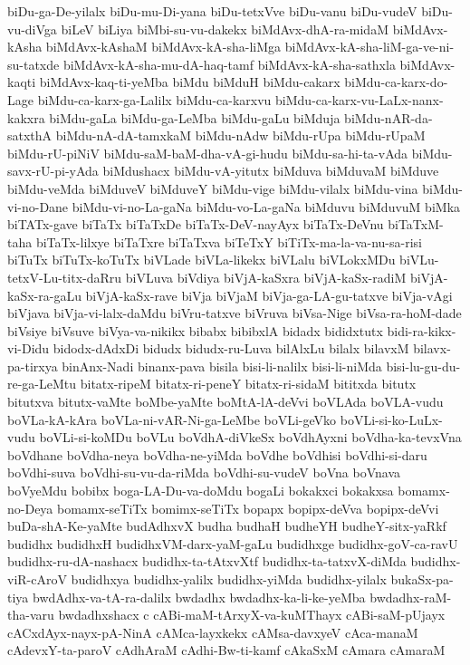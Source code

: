 {biDu-ga-De-yilalx
biDu-mu-Di-yana
biDu-tetxVve
biDu-vanu
biDu-vudeV
biDu-vu-diVga
biLeV
biLiya
biMbi-su-vu-dakekx
biMdAvx-dhA-ra-midaM
biMdAvx-kAsha
biMdAvx-kAshaM
biMdAvx-kA-sha-liMga
biMdAvx-kA-sha-liM-ga-ve-ni-su-tatxde
biMdAvx-kA-sha-mu-dA-haq-tamf
biMdAvx-kA-sha-sathxla
biMdAvx-kaqti
biMdAvx-kaq-ti-yeMba
biMdu
biMduH
biMdu-cakarx
biMdu-ca-karx-do-Lage
biMdu-ca-karx-ga-Lalilx
biMdu-ca-karxvu
biMdu-ca-karx-vu-LaLx-nanx-kakxra
biMdu-gaLa
biMdu-ga-LeMba
biMdu-gaLu
biMduja
biMdu-nAR-da-satxthA
biMdu-nA-dA-tamxkaM
biMdu-nAdw
biMdu-rUpa
biMdu-rUpaM
biMdu-rU-piNiV
biMdu-saM-baM-dha-vA-gi-hudu
biMdu-sa-hi-ta-vAda
biMdu-savx-rU-pi-yAda
biMdushacx
biMdu-vA-yitutx
biMduva
biMduvaM
biMduve
biMdu-veMda
biMduveV
biMduveY
biMdu-vige
biMdu-vilalx
biMdu-vina
biMdu-vi-no-Dane
biMdu-vi-no-La-gaNa
biMdu-vo-La-gaNa
biMduvu
biMduvuM
biMka
biTATx-gave
biTaTx
biTaTxDe
biTaTx-DeV-nayAyx
biTaTx-DeVnu
biTaTxM-taha
biTaTx-lilxye
biTaTxre
biTaTxva
biTeTxY
biTiTx-ma-la-va-nu-sa-risi
biTuTx
biTuTx-koTuTx
biVLade
biVLa-likekx
biVLalu
biVLokxMDu
biVLu-tetxV-Lu-titx-daRru
biVLuva
biVdiya
biVjA-kaSxra
biVjA-kaSx-radiM
biVjA-kaSx-ra-gaLu
biVjA-kaSx-rave
biVja
biVjaM
biVja-ga-LA-gu-tatxve
biVja-vAgi
biVjava
biVja-vi-lalx-daMdu
biVru-tatxve
biVruva
biVsa-Nige
biVsa-ra-hoM-dade
biVsiye
biVsuve
biVya-va-nikikx
bibabx
bibibxlA
bidadx
bididxtutx
bidi-ra-kikx-vi-Didu
bidodx-dAdxDi
bidudx
bidudx-ru-Luva
bilAlxLu
bilalx
bilavxM
bilavx-pa-tirxya
binAnx-Nadi
binanx-pava
bisila
bisi-li-nalilx
bisi-li-niMda
bisi-lu-gu-du-re-ga-LeMtu
bitatx-ripeM
bitatx-ri-peneY
bitatx-ri-sidaM
bititxda
bitutx
bitutxva
bitutx-vaMte
boMbe-yaMte
boMtA-lA-deVvi
boVLAda
boVLA-vudu
boVLa-kA-kAra
boVLa-ni-vAR-Ni-ga-LeMbe
boVLi-geVko
boVLi-si-ko-LuLx-vudu
boVLi-si-koMDu
boVLu
boVdhA-diVkeSx
boVdhAyxni
boVdha-ka-tevxVna
boVdhane
boVdha-neya
boVdha-ne-yiMda
boVdhe
boVdhisi
boVdhi-si-daru
boVdhi-suva
boVdhi-su-vu-da-riMda
boVdhi-su-vudeV
boVna
boVnava
boVyeMdu
bobibx
boga-LA-Du-va-doMdu
bogaLi
bokakxci
bokakxsa
bomamx-no-Deya
bomamx-seTiTx
bomimx-seTiTx
bopapx
bopipx-deVva
bopipx-deVvi
buDa-shA-Ke-yaMte
budAdhxvX
budha
budhaH
budheYH
budheY-sitx-yaRkf
budidhx
budidhxH
budidhxVM-darx-yaM-gaLu
budidhxge
budidhx-goV-ca-ravU
budidhx-ru-dA-nashacx
budidhx-ta-tAtxvXtf
budidhx-ta-tatxvX-diMda
budidhx-viR-cAroV
budidhxya
budidhx-yalilx
budidhx-yiMda
budidhx-yilalx
bukaSx-pa-tiya
bwdAdhx-va-tA-ra-dalilx
bwdadhx
bwdadhx-ka-li-ke-yeMba
bwdadhx-raM-tha-varu
bwdadhxshacx
c
cABi-maM-tArxyX-va-kuMThayx
cABi-saM-pUjayx
cACxdAyx-nayx-pA-NinA
cAMca-layxkekx
cAMsa-davxyeV
cAca-manaM
cAdevxY-ta-paroV
cAdhAraM
cAdhi-Bw-ti-kamf
cAkaSxM
cAmara
cAmaraM
}
